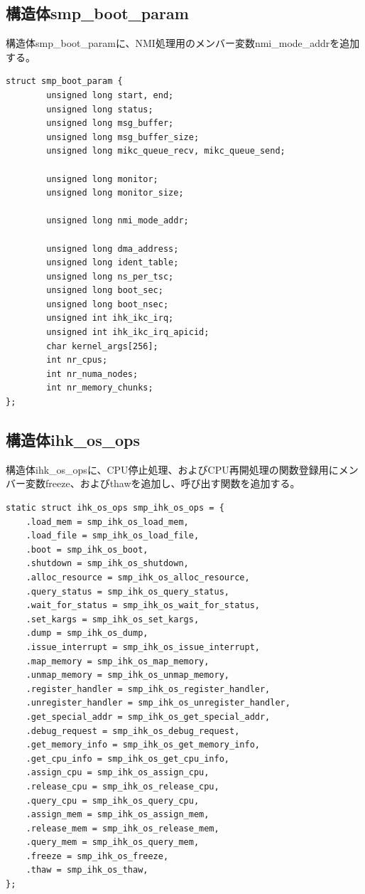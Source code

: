 \documentclass[twoside,11pt,fleqn]{book}
\begin{document}
{\subsection{構造体smp\_boot\_param}
構造体smp\_boot\_paramに、NMI処理用のメンバー変数nmi\_mode\_addrを追加する。
\begin{verbatim}
struct smp_boot_param {
        unsigned long start, end;
        unsigned long status;
        unsigned long msg_buffer;
        unsigned long msg_buffer_size;
        unsigned long mikc_queue_recv, mikc_queue_send;

        unsigned long monitor;
        unsigned long monitor_size;

        unsigned long nmi_mode_addr;

        unsigned long dma_address;
        unsigned long ident_table;
        unsigned long ns_per_tsc;
        unsigned long boot_sec;
        unsigned long boot_nsec;
        unsigned int ihk_ikc_irq;
        unsigned int ihk_ikc_irq_apicid;
        char kernel_args[256];
        int nr_cpus;
        int nr_numa_nodes;
        int nr_memory_chunks;
};
\end{verbatim}

\subsection{構造体ihk\_os\_ops}
構造体ihk\_os\_opsに、CPU停止処理、およびCPU再開処理の関数登録用にメンバー変数freeze、およびthawを追加し、呼び出す関数を追加する。
\begin{verbatim}
static struct ihk_os_ops smp_ihk_os_ops = {
    .load_mem = smp_ihk_os_load_mem,
    .load_file = smp_ihk_os_load_file,
    .boot = smp_ihk_os_boot,
    .shutdown = smp_ihk_os_shutdown,
    .alloc_resource = smp_ihk_os_alloc_resource,
    .query_status = smp_ihk_os_query_status,
    .wait_for_status = smp_ihk_os_wait_for_status,
    .set_kargs = smp_ihk_os_set_kargs,
    .dump = smp_ihk_os_dump,
    .issue_interrupt = smp_ihk_os_issue_interrupt,
    .map_memory = smp_ihk_os_map_memory,
    .unmap_memory = smp_ihk_os_unmap_memory,
    .register_handler = smp_ihk_os_register_handler,
    .unregister_handler = smp_ihk_os_unregister_handler,
    .get_special_addr = smp_ihk_os_get_special_addr,
    .debug_request = smp_ihk_os_debug_request,
    .get_memory_info = smp_ihk_os_get_memory_info,
    .get_cpu_info = smp_ihk_os_get_cpu_info,
    .assign_cpu = smp_ihk_os_assign_cpu,
    .release_cpu = smp_ihk_os_release_cpu,
    .query_cpu = smp_ihk_os_query_cpu,
    .assign_mem = smp_ihk_os_assign_mem,
    .release_mem = smp_ihk_os_release_mem,
    .query_mem = smp_ihk_os_query_mem,
    .freeze = smp_ihk_os_freeze,
    .thaw = smp_ihk_os_thaw,
};
\end{verbatim}

}
\end{document}
